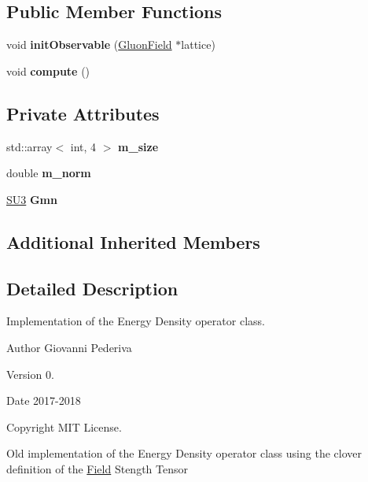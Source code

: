 \subsection*{Public Member Functions}
\begin{DoxyCompactItemize}
\item 
void {\bfseries init\+Observable} (\hyperlink{field_8h_afe80b127697eba6d6e7fbd8121c8d4ee}{Gluon\+Field} $\ast$lattice)\hypertarget{classEnergyDensity_ad076c85838b7d1e4d795655818369409}{}\label{classEnergyDensity_ad076c85838b7d1e4d795655818369409}

\item 
void {\bfseries compute} ()\hypertarget{classEnergyDensity_a8719af212e9534be4f23244c0ea85019}{}\label{classEnergyDensity_a8719af212e9534be4f23244c0ea85019}

\end{DoxyCompactItemize}
\subsection*{Private Attributes}
\begin{DoxyCompactItemize}
\item 
std\+::array$<$ int, 4 $>$ {\bfseries m\+\_\+size}\hypertarget{classEnergyDensity_a86486c6e6f1f4a0db45e33fe17c3eb84}{}\label{classEnergyDensity_a86486c6e6f1f4a0db45e33fe17c3eb84}

\item 
double {\bfseries m\+\_\+norm}\hypertarget{classEnergyDensity_a62b537a325d00c79646876d9178ddc22}{}\label{classEnergyDensity_a62b537a325d00c79646876d9178ddc22}

\item 
\hyperlink{structSU3}{S\+U3} {\bfseries Gmn}\hypertarget{classEnergyDensity_a7beebd4229b64e2829a4bf7fa708845f}{}\label{classEnergyDensity_a7beebd4229b64e2829a4bf7fa708845f}

\end{DoxyCompactItemize}
\subsection*{Additional Inherited Members}


\subsection{Detailed Description}
Implementation of the Energy Density operator class. 

\begin{DoxyAuthor}{Author}
Giovanni Pederiva 
\end{DoxyAuthor}
\begin{DoxyVersion}{Version}
0. 
\end{DoxyVersion}
\begin{DoxyDate}{Date}
2017-\/2018 
\end{DoxyDate}
\begin{DoxyCopyright}{Copyright}
M\+IT License.
\end{DoxyCopyright}
Old implementation of the Energy Density operator class using the clover definition of the \hyperlink{classField}{Field} Stength Tensor 

